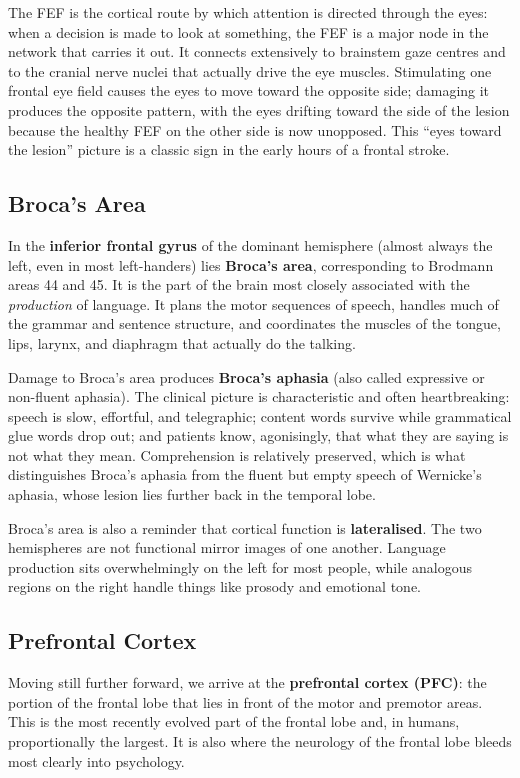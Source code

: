 \documentclass[11pt]{article}
\begin{document}
The FEF is the cortical route by which attention is directed through the eyes: when a decision is made to look at something, the FEF is a major node in the network that carries it out. It connects extensively to brainstem gaze centres and to the cranial nerve nuclei that actually drive the eye muscles. Stimulating one frontal eye field causes the eyes to move toward the opposite side; damaging it produces the opposite pattern, with the eyes drifting toward the side of the lesion because the healthy FEF on the other side is now unopposed. This ``eyes toward the lesion'' picture is a classic sign in the early hours of a frontal stroke.

\subsection{Broca's Area}

In the \textbf{inferior frontal gyrus} of the dominant hemisphere (almost always the left, even in most left-handers) lies \textbf{Broca's area}, corresponding to Brodmann areas 44 and 45. It is the part of the brain most closely associated with the \textit{production} of language. It plans the motor sequences of speech, handles much of the grammar and sentence structure, and coordinates the muscles of the tongue, lips, larynx, and diaphragm that actually do the talking.

Damage to Broca's area produces \textbf{Broca's aphasia} (also called expressive or non-fluent aphasia). The clinical picture is characteristic and often heartbreaking: speech is slow, effortful, and telegraphic; content words survive while grammatical glue words drop out; and patients know, agonisingly, that what they are saying is not what they mean. Comprehension is relatively preserved, which is what distinguishes Broca's aphasia from the fluent but empty speech of Wernicke's aphasia, whose lesion lies further back in the temporal lobe.

Broca's area is also a reminder that cortical function is \textbf{lateralised}. The two hemispheres are not functional mirror images of one another. Language production sits overwhelmingly on the left for most people, while analogous regions on the right handle things like prosody and emotional tone.

\subsection{Prefrontal Cortex}

Moving still further forward, we arrive at the \textbf{prefrontal cortex (PFC)}: the portion of the frontal lobe that lies in front of the motor and premotor areas. This is the most recently evolved part of the frontal lobe and, in humans, proportionally the largest. It is also where the neurology of the frontal lobe bleeds most clearly into psychology.
\end{document}
